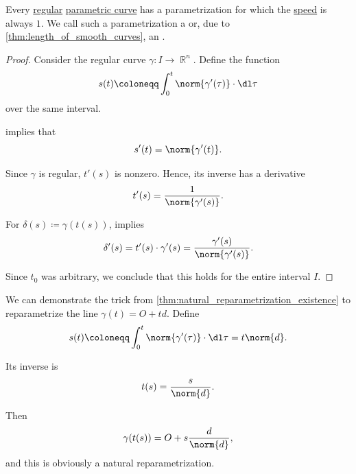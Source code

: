 \begin{proposition}\label{thm:natural_parametrization_existence}
  Every \hyperref[def:regular_curve]{regular} \hyperref[def:parametric_curve]{parametric curve} has a parametrization for which the \hyperref[def:curve_speed]{speed} is always \( 1 \). We call such a parametrization a  or, due to \cref{thm:length_of_smooth_curves}, an .
\end{proposition}
\begin{proof}
  Consider the regular curve \( \gamma: I \to \BbbR^n \). Define the function
  \begin{equation*}
    s(t) \coloneqq \int_0^t \norm{\gamma'(\tau)} \cdot \dl \tau
  \end{equation*}
  over the same interval.

   implies that
  \begin{equation*}
    s'(t) = \norm{\gamma'(t)}.
  \end{equation*}

  Since \( \gamma \) is regular, \( t'(s) \) is nonzero. Hence, its inverse has a derivative
  \begin{equation*}
    t'(s) = \frac 1 {\norm{\gamma'(s)}}.
  \end{equation*}

  For \( \delta(s) \coloneqq \gamma(t(s)) \),  implies
  \begin{equation*}
    \delta'(s)
    =
    t'(s) \cdot \gamma'(s)
    =
    \frac {\gamma'(s)} {\norm{\gamma'(s)}}.
  \end{equation*}

  Since \( t_0 \) was arbitrary, we conclude that this holds for the entire interval \( I \).
\end{proof}

\begin{example}\label{ex:natural_reparametrization_of_line}
  We can demonstrate the trick from \cref{thm:natural_reparametrization_existence} to reparametrize the line \( \gamma(t) = O + td \). Define
  \begin{equation*}
    s(t) \coloneqq \int_0^t \norm{\gamma'(\tau)} \cdot \dl \tau = t \norm{d}.
  \end{equation*}

  Its inverse is
  \begin{equation*}
    t(s) = \frac s {\norm{d}}.
  \end{equation*}

  Then
  \begin{equation*}
    \gamma(t(s)) = O + s \frac d {\norm{d}},
  \end{equation*}
  and this is obviously a natural reparametrization.
\end{example}

